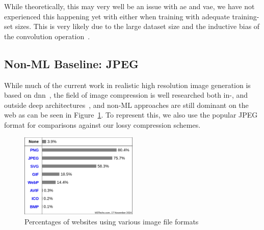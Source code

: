While theoretically, this may very well be an issue with \ac{ae} and \ac{vae}, we have not experienced this happening
yet with either when training with adequate training-set sizes.
This is very likely due to the large dataset size and the inductive bias of the convolution operation~\cite{citationNeeded}.

\subsection{Non-ML Baseline: JPEG}\label{subsec:jpeg}
While much of the current work in realistic high resolution image generation is based on \ac{dnn}~\cite{citationNeeded},
the field of image compression is well researched both in-, and outside deep architectures~\cite{compression},
and non-ML approaches are still dominant on the web as can be seen in Figure~\ref{fig:file_formats}.
To represent this, we also use the popular JPEG format for comparisons against our lossy compression schemes.

\begin{figure}[H]
    \centering
    \includegraphics[width=0.5\textwidth]{images/formats}
    \caption{Percentages of websites using various image file formats~\cite{img_file_format}}
    \label{fig:file_formats}
\end{figure}
